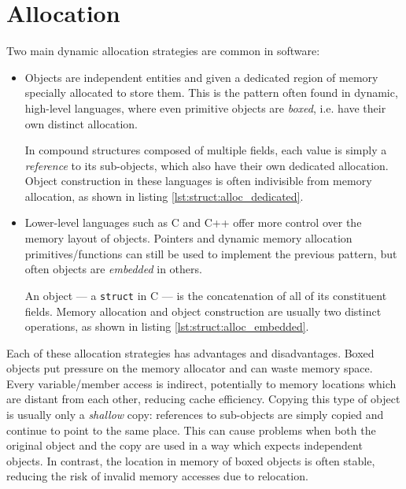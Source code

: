 \section{Allocation}

Two main dynamic allocation strategies are common in software:

\begin{itemize}
    \item
        Objects are independent entities and given a dedicated region of memory
        specially allocated to store them.  This is the pattern often found in
        dynamic, high-level languages, where even primitive objects are
        \textit{boxed}, i.e. have their own distinct allocation.

        In compound structures composed of multiple fields, each value is simply
        a \textit{reference} to its sub-objects, which also have their own
        dedicated allocation.  Object construction in these languages is often
        indivisible from memory allocation, as shown in listing
        \ref{lst:struct:alloc_dedicated}.
    \item
        Lower-level languages such as C and C++ offer more control over the
        memory layout of objects.  Pointers and dynamic memory allocation
        primitives/functions can still be used to implement the previous
        pattern, but often objects are \textit{embedded} in others.

        An object --- a \texttt{struct} in C --- is the concatenation of all of
        its constituent fields\footnotemark.  Memory allocation and object
        construction are usually two distinct operations, as shown in listing
        \ref{lst:struct:alloc_embedded}.
\end{itemize}


Each of these allocation strategies has advantages and disadvantages.  Boxed
objects put pressure on the memory allocator and can waste memory space.  Every
variable/member access is indirect, potentially to memory locations which are
distant from each other, reducing cache efficiency.  Copying this type of object
is usually only a \textit{shallow} copy: references to sub-objects are simply
copied and continue to point to the same place.  This can cause problems when
both the original object and the copy are used in a way which expects
independent objects.  In contrast, the location in memory of boxed objects is
often stable, reducing the risk of invalid memory accesses due to relocation.

